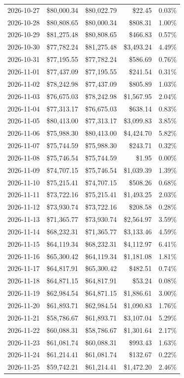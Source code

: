 \documentclass[11pt,a4paper]{article}
\begin{document}
{\begin{longtable}{rrrrr}
2026-10-27 & \$80,000.34 & \$80,022.79 & \$22.45 & 0.03\% \\
2026-10-28 & \$80,808.65 & \$80,000.34 & \$808.31 & 1.00\% \\
2026-10-29 & \$81,275.48 & \$80,808.65 & \$466.83 & 0.57\% \\
2026-10-30 & \$77,782.24 & \$81,275.48 & \$3,493.24 & 4.49\% \\
2026-10-31 & \$77,195.55 & \$77,782.24 & \$586.69 & 0.76\% \\
2026-11-01 & \$77,437.09 & \$77,195.55 & \$241.54 & 0.31\% \\
2026-11-02 & \$78,242.98 & \$77,437.09 & \$805.89 & 1.03\% \\
2026-11-03 & \$76,675.03 & \$78,242.98 & \$1,567.95 & 2.04\% \\
2026-11-04 & \$77,313.17 & \$76,675.03 & \$638.14 & 0.83\% \\
2026-11-05 & \$80,413.00 & \$77,313.17 & \$3,099.83 & 3.85\% \\
2026-11-06 & \$75,988.30 & \$80,413.00 & \$4,424.70 & 5.82\% \\
2026-11-07 & \$75,744.59 & \$75,988.30 & \$243.71 & 0.32\% \\
2026-11-08 & \$75,746.54 & \$75,744.59 & \$1.95 & 0.00\% \\
2026-11-09 & \$74,707.15 & \$75,746.54 & \$1,039.39 & 1.39\% \\
2026-11-10 & \$75,215.41 & \$74,707.15 & \$508.26 & 0.68\% \\
2026-11-11 & \$73,722.16 & \$75,215.41 & \$1,493.25 & 2.03\% \\
2026-11-12 & \$73,930.74 & \$73,722.16 & \$208.58 & 0.28\% \\
2026-11-13 & \$71,365.77 & \$73,930.74 & \$2,564.97 & 3.59\% \\
2026-11-14 & \$68,232.31 & \$71,365.77 & \$3,133.46 & 4.59\% \\
2026-11-15 & \$64,119.34 & \$68,232.31 & \$4,112.97 & 6.41\% \\
2026-11-16 & \$65,300.42 & \$64,119.34 & \$1,181.08 & 1.81\% \\
2026-11-17 & \$64,817.91 & \$65,300.42 & \$482.51 & 0.74\% \\
2026-11-18 & \$64,871.15 & \$64,817.91 & \$53.24 & 0.08\% \\
2026-11-19 & \$62,984.54 & \$64,871.15 & \$1,886.61 & 3.00\% \\
2026-11-20 & \$61,893.71 & \$62,984.54 & \$1,090.83 & 1.76\% \\
2026-11-21 & \$58,786.67 & \$61,893.71 & \$3,107.04 & 5.29\% \\
2026-11-22 & \$60,088.31 & \$58,786.67 & \$1,301.64 & 2.17\% \\
2026-11-23 & \$61,081.74 & \$60,088.31 & \$993.43 & 1.63\% \\
2026-11-24 & \$61,214.41 & \$61,081.74 & \$132.67 & 0.22\% \\
2026-11-25 & \$59,742.21 & \$61,214.41 & \$1,472.20 & 2.46\% \\
\end{longtable}
}
\end{document}
